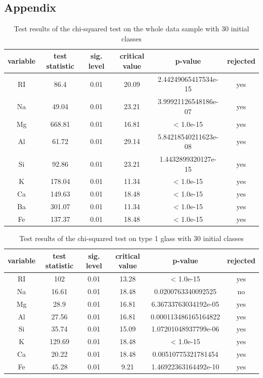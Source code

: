 \documentclass[a4paper, 12pt, titlepage, headsepline, listof = totoc, bibliography = totoc, numbers = noenddot]{scrartcl}
\begin{document}
\newpage

\begin{appendix}



\section{Appendix}

\begin{table}[h!]
\centering
\begin{tabular}{|cccccc|} \hline variable & test statistic & sig. level & critical value & p-value & rejected\\ \hline RI & 86.4 & 0.01 & 20.09 & 2.44249065417534e-15 & yes\\ 
Na & 49.04 & 0.01 & 23.21 & 3.99921126548186e-07 & yes\\ 
Mg & 668.81 & 0.01 & 16.81 & < 1.0e-15 & yes\\ 
Al & 61.72 & 0.01 & 29.14 & 5.84218540211623e-08 & yes\\ 
Si & 92.86 & 0.01 & 23.21 & 1.4432899320127e-15 & yes\\ 
K & 178.04 & 0.01 & 11.34 & < 1.0e-15 & yes\\ 
Ca & 149.63 & 0.01 & 18.48 & < 1.0e-15 & yes\\ 
Ba & 301.07 & 0.01 & 11.34 & < 1.0e-15 & yes\\ 
Fe & 137.37 & 0.01 & 18.48 & < 1.0e-15 & yes\\ \hline \end{tabular}\caption{Test results of the chi-squared test on the whole data sample with 30 initial classes}
\label{tab:chi-full-30}
\end{table}

\begin{table}[h!]
\centering
\begin{tabular}{|cccccc|} \hline variable & test statistic & sig. level & critical value & p-value & rejected\\ \hline RI & 102 & 0.01 & 13.28 & < 1.0e-15 & yes\\ 
Na & 16.61 & 0.01 & 18.48 & 0.0200763340092525 & no\\ 
Mg & 28.9 & 0.01 & 16.81 & 6.36733763034192e-05 & yes\\ 
Al & 27.56 & 0.01 & 16.81 & 0.000113486165164822 & yes\\ 
Si & 35.74 & 0.01 & 15.09 & 1.07201048937799e-06 & yes\\ 
K & 129.69 & 0.01 & 18.48 & < 1.0e-15 & yes\\ 
Ca & 20.22 & 0.01 & 18.48 & 0.00510775321781454 & yes\\ 
Fe & 45.28 & 0.01 & 9.21 & 1.46922363164492e-10 & yes\\ \hline \end{tabular}\caption{Test results of the chi-squared test on type 1 glass with 30 initial classes}
\label{tab:chi-type1-30}
\end{table}


\end{appendix}
\end{document}
